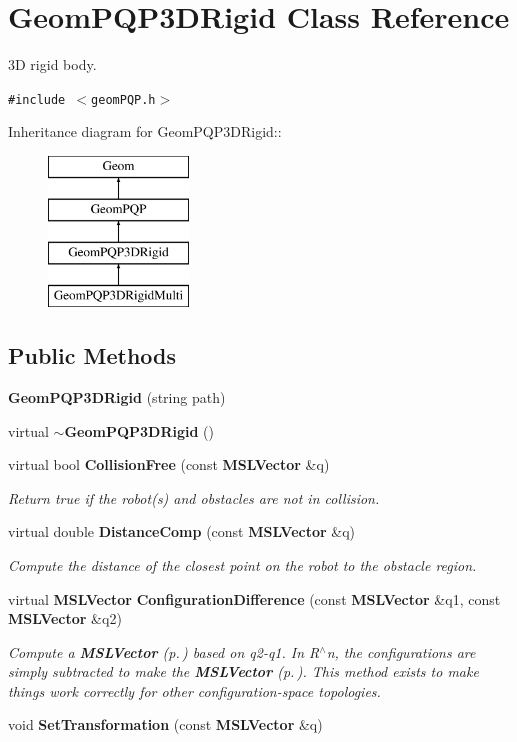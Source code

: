 \section{Geom\-PQP3DRigid  Class Reference}
\label{class_GeomPQP3DRigid}
3D rigid body. 


{\tt \#include $<$geom\-PQP.h$>$}

Inheritance diagram for Geom\-PQP3DRigid::\begin{figure}[H]
\begin{center}
\leavevmode
\includegraphics[height=4cm]{class_GeomPQP3DRigid}
\end{center}
\end{figure}
\subsection*{Public Methods}
\begin{CompactItemize}
\item 
{\bf Geom\-PQP3DRigid} (string path)
\item 
virtual {\bf $\sim$Geom\-PQP3DRigid} ()
\item 
virtual bool {\bf Collision\-Free} (const {\bf MSLVector} \&q)
\begin{CompactList}\small\item\em Return true if the robot(s) and obstacles are not in collision.\item\end{CompactList}\item 
virtual double {\bf Distance\-Comp} (const {\bf MSLVector} \&q)
\begin{CompactList}\small\item\em Compute the distance of the closest point on the robot to the obstacle region.\item\end{CompactList}\item 
virtual {\bf MSLVector} {\bf Configuration\-Difference} (const {\bf MSLVector} \&q1, const {\bf MSLVector} \&q2)
\begin{CompactList}\small\item\em Compute a {\bf MSLVector} {\rm (p.\,\pageref{class_MSLVector})} based on q2-q1. In R$^\wedge$n, the configurations are simply subtracted to make the {\bf MSLVector} {\rm (p.\,\pageref{class_MSLVector})}. This method exists to make things work correctly for other configuration-space topologies.\item\end{CompactList}\item 
void {\bf Set\-Transformation} (const {\bf MSLVector} \&q)
\end{CompactItemize}


